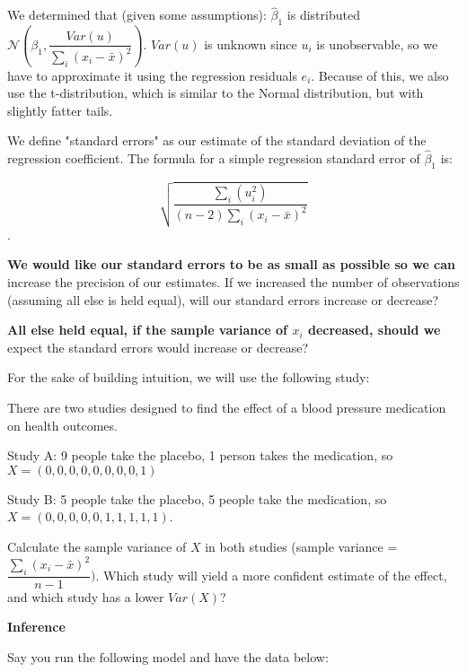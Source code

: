 \documentclass[12pt]{exam}
\begin{document}
\selectfont

We determined that (given some assumptions): $\hat{\beta}_{1}$ is distributed $\mathcal{N} \left(\beta_{1}, \dfrac{Var(u)}{\sum_{i} (x_{i} - \bar{x})^{2}}\right)$.
$Var(u)$ is unknown since $u_{i}$ is unobservable, so we have to approximate it using the regression residuals $e_{i}$.
Because of this, we also use the t-distribution, which is similar to the Normal distribution, but with slightly fatter tails. 

We define "standard errors" as our estimate of the standard deviation of the regression coefficient. 
The formula for a simple regression standard error of $\hat{\beta}_{1}$ is:

$$\sqrt{\dfrac{\sum_{i}(u_{i}^{2})}{(n-2)\sum_{i} (x_{i} - \bar{x})^{2}}}$$.

\begin{questions}


\question %
\textbf{We would like our standard errors to be as small as possible so we can} increase the precision of our estimates. 
If we increased the number of observations (assuming all else is held equal), will our standard errors increase or decrease?


\question %
\textbf{All else held equal, if the sample variance of $x_{i}$ decreased, should we} expect the standard errors would increase or decrease?

For the sake of building intuition, we will use the following study:

There are two studies designed to find the effect of a blood pressure medication on health outcomes. 

Study A: 9 people take the placebo, 1 person takes the medication, so $X = (0,0,0,0,0,0,0,0,1)$

Study B: 5 people take the placebo, 5 people take the medication, so $X = (0,0,0,0,0,1,1,1,1,1)$.

Calculate the sample variance of $X$ in both studies (sample variance = $\dfrac{\sum_{i} (x_{i} - \bar{x})^{2}}{n - 1})$.
Which study will yield a more confident estimate of the effect, and which study has a lower $Var(X)$?


\newpage 

\question %
\textbf{Inference}

Say you run the following model and have the data below:


\end{questions}
\end{document}
